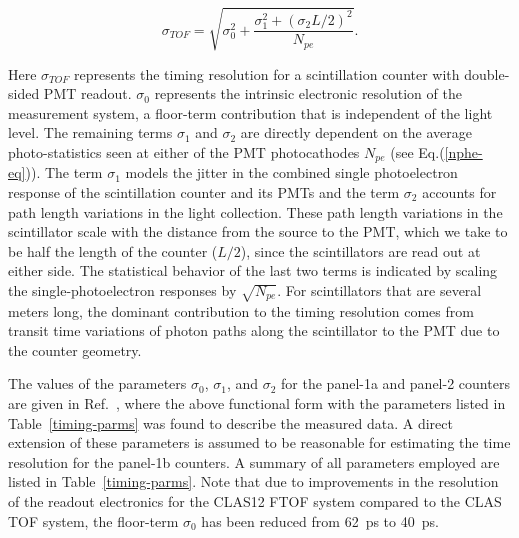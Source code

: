 \documentclass[3p,times,twocolumn]{elsarticle}
\begin{document}
\begin{equation}
\label{timing-func}
\sigma_{TOF} = \sqrt{\sigma_0^2 + \frac{\sigma_1^2 + (\sigma_2 L/2)^2} {N_{pe}}}.
\end{equation}

\noindent
Here $\sigma_{TOF}$ represents the timing resolution for a scintillation counter with double-sided PMT
readout. $\sigma_0$ represents the intrinsic electronic resolution of the measurement system, a
floor-term contribution that is independent of the light level. The remaining terms $\sigma_1$ and
$\sigma_2$ are directly dependent on the average photo-statistics seen at either of the PMT
photocathodes $N_{pe}$ (see Eq.(\ref{nphe-eq})). The term $\sigma_1$ models the jitter in the combined
single photoelectron response of the scintillation counter and its PMTs and the term $\sigma_2$ accounts
for path length variations in the light collection.  These path length variations in the scintillator scale with
the distance from the source to the PMT, which we take to be half the length of the counter ($L/2$), since
the scintillators are read out at either side.  The statistical behavior of the last two terms is indicated by
scaling the single-photoelectron responses by $\sqrt{N_{pe}}$. For scintillators that are several meters
long, the dominant contribution to the timing resolution comes from transit time variations of photon paths
along the scintillator to the PMT due to the counter geometry.

The values of the parameters $\sigma_0$, $\sigma_1$, and $\sigma_2$ for the panel-1a and panel-2
counters are given in Ref.~\cite{tof-nim}, where the above functional form with the parameters listed
in Table~\ref{timing-parms} was found to describe the measured data. A direct extension of these
parameters is assumed to be reasonable for estimating the time resolution for the panel-1b counters.
A summary of all parameters employed are listed in Table~\ref{timing-parms}. Note that due to
improvements in the resolution of the readout electronics for the CLAS12 FTOF system compared to
the CLAS TOF system, the floor-term $\sigma_0$ has been reduced from 62~ps to 40~ps. 
\end{document}
